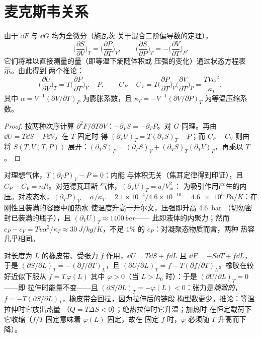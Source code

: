 \section{麦克斯韦关系}

\begin{theorem}[麦克斯韦关系]\label{thm:b2:thermodynamic-potentials:maxwell}
由于 $\dd F$ 与 $\dd G$ 均为全微分（施瓦茨
关于混合二阶偏导数的定理），
\[
\Big(\frac{\partial S}{\partial V}\Big)_T = \Big(\frac{\partial P}{\partial T}\Big)_V,
\qquad
\Big(\frac{\partial S}{\partial P}\Big)_T = -\Big(\frac{\partial V}{\partial T}\Big)_P .
\]
它们将难以直接测量的量（即等温下熵随体积或
压强的变化）通过状态方程表示。由此得到
两个推论：
\[
\Big(\frac{\partial U}{\partial V}\Big)_T = T\Big(\frac{\partial P}{\partial T}\Big)_V - P,
\qquad
C_P - C_V = T\Big(\frac{\partial P}{\partial T}\Big)_V\Big(\frac{\partial V}{\partial T}\Big)_P
= \frac{TV\alpha^2}{\kappa_T} ,
\]
其中 $\alpha = V^{-1}(\partial V/\partial T)_P$ 为膨胀系数，且
$\kappa_T = -V^{-1}(\partial V/\partial P)_T$ 为等温压缩系数。
\end{theorem}

\begin{proof}
按两种次序计算 $\partial^2F/\partial T\partial V$：$-\partial_VS =
-\partial_TP$。对 $G$ 同理。再由 $\dd U = T\dd S - P\dd V$，在 $T$ 固定时
得 $(\partial_VU)_T = T(\partial_VS)_T - P$；而 $C_P - C_V$ 则由
将 $S(T,V(T,P))$ 展开：$(\partial_TS)_P = (\partial_TS)_V +
(\partial_VS)_T(\partial_TV)_P$，再乘以 $T$。
\end{proof}

\begin{example}[关系式的启示]\label{ex:b2:thermodynamic-potentials:reveal}
对理想气体，$T(\partial_TP)_V - P = 0$：内能
与体积无关（焦耳定律得到印证），且 $C_P - C_V = nR$。对范德瓦耳斯
气体，$(\partial_VU)_T = a/V_{\text{m}}^2$：
为吸引作用产生的内压。对液态水，$(\partial_TP)_V = \alpha/\kappa_T = 2.1
\times 10^{-4}/4.6 \times 10^{-10} = \qty{4.6e5}{Pa/K}$：在刚性且装满的容器中加热水
使温度升高一开尔文，压强即升高 \qty{4.6}{bar}
（切勿密封已装满的瓶子），且 $(\partial_VU)_T \approx \qty{1400}{bar}$——
此即液体的内聚力；然而 $c_P - c_V = Tv\alpha^2/\kappa_T \approx
\qty{30}{J/kg/K}$，不足 $1\%$ 的 $c_P$：对凝聚态物质而言，两种
热容几乎相同。
\end{example}

\begin{proposition}[橡胶的熵弹性]\label{prop:b2:thermodynamic-potentials:rubber}
对长度为 $L$ 的橡皮带、受张力 $f$ 作用，$\dd U = T\dd S + f\dd L$
且 $\dd F = -S\dd T + f\dd L$，于是 $(\partial S/\partial L)_T =
-(\partial f/\partial T)_L$，且 $(\partial U/\partial L)_T = f - T(\partial f/
\partial T)_L$。橡胶在较好近似下服从 $f = T\,\varphi(L)$
其中 $\varphi > 0$（当 $L > L_0$ 时）：于是 $(\partial U/\partial L)_T = 0$——即
拉伸时能量不变——且 $(\partial S/\partial L)_T =
-\varphi(L) < 0$：张力是\emph{熵致的}，$f = -T(\partial S/\partial
L)_T$，橡皮带会回拉，因为拉伸后的链段
构型数更少。推论：等温拉伸时它放出热量
（$Q = T\Delta S < 0$）；绝热拉伸时它升温；加热时
在恒定载荷下它收缩（$f/T$ 固定意味着 $\varphi(L)$ 固定，故在
固定 $f$ 时，$\varphi$ 必须随 $T$ 升高而下降）。
\end{proposition}


